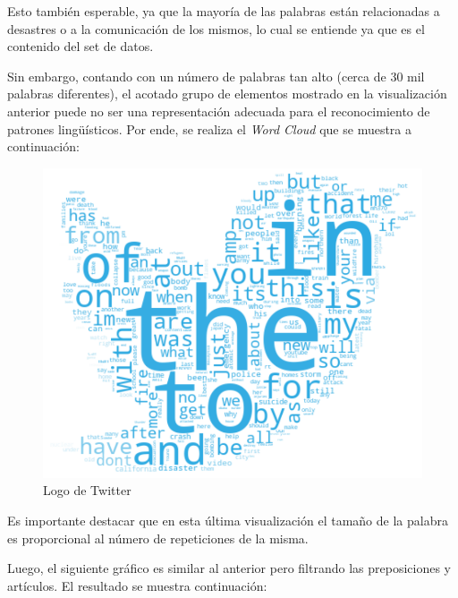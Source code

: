 \documentclass[titlepage,a4paper]{article}
\begin{document}
    Esto también esperable, ya que la mayoría de las palabras están relacionadas a desastres o a la comunicación de los mismos, lo cual se entiende ya que es el contenido del set de datos.

    Sin embargo, contando con un número de palabras tan alto (cerca de 30 mil palabras diferentes), el acotado grupo de elementos mostrado en la visualización anterior puede no ser una representación adecuada para el reconocimiento de patrones lingüísticos. Por ende, se realiza el \textit{Word Cloud} que se muestra a continuación:
    
     \begin{figure}[H]
    \centering
    \includegraphics[width=1\textwidth]{graficos/Analisis Lexico Grafico/PalabrasMasUsadasSinFiltro.png}
    \caption{Logo de Twitter}
    \end{figure}
    
    Es importante destacar que en esta última visualización el tamaño de la palabra es proporcional al número de repeticiones de la misma.
    
    Luego, el siguiente gráfico es similar al anterior pero filtrando las preposiciones y artículos. El resultado se muestra continuación:
    
\end{document}

